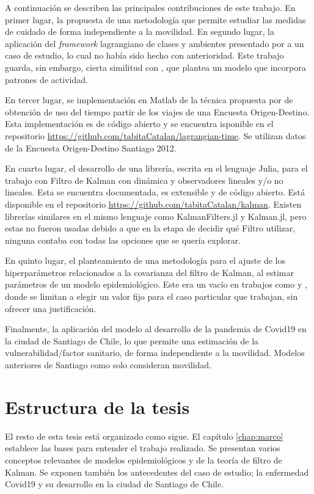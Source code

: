 \begin{intro}
A continuación se describen las principales contribuciones de este trabajo. En primer lugar, la propuesta de una metodología que permite estudiar las medidas de cuidado de forma independiente a la movilidad. En segundo lugar, la aplicación del \textit{framework} lagrangiano de clases y ambientes presentado por \cite{Bichara2018} a un caso de estudio, lo cual no había sido hecho con anterioridad. Este trabajo guarda, sin embargo, cierta similitud con \cite{Shikhmurzaev}, que plantea un modelo que incorpora patrones de actividad.

En tercer lugar, se implementación en Matlab de la técnica propuesta por \cite{Munizaga2011} de obtención de uso del tiempo partir de los viajes de una Encuesta Origen-Destino. Esta implementación es de código abierto y se encuentra isponible en el repositorio \url{https://github.com/tabitaCatalan/lagrangian-time}. Se utilizan datos de la Encuesta Origen-Destino Santiago 2012.

En cuarto lugar, el desarrollo de una librería, escrita en el lenguaje Julia, para el trabajo con Filtro de Kalman con dinámica y observadores lineales y/o no lineales. Esta se encuentra documentada, es extensible y de código abierto. Está disponible en el repositorio \url{https://github.com/tabitaCatalan/kalman}. Existen librerías similares en el mismo lenguaje como KalmanFilters.jl y Kalman.jl, pero estas no fueron usadas debido a que en la etapa de decidir qué Filtro utilizar, ninguna contaba con todas las opciones que se quería explorar. 

En quinto lugar, el planteamiento de una metodología para el ajuste de los hiperparámetros relacionados a la covarianza del filtro de Kalman, al estimar parámetros de un modelo epidemiológico. Este era un vacío en trabajos como \cite{Hasan2020} y \cite{Sameni2020}, donde se limitan a elegir un valor fijo para el caso particular que trabajan, sin ofrecer una justificación.

Finalmente, la aplicación del modelo al desarrollo de la pandemia de Covid19 en la ciudad de Santiago de Chile, lo que permite una estimación de la vulnerabilidad/factor sanitario, de forma independiente a la movilidad. Modelos anteriores de Santiago como \cite{Gozzi2021} solo consideran movilidad.


\section*{Estructura de la tesis}
El resto de esta tesis está organizado como sigue. El capítulo \ref{chap:marco} establece las bases para entender el trabajo realizado. Se presentan varios conceptos relevantes de modelos epidemiológicos y de la teoría de filtro de Kalman. Se exponen también los antecedentes del caso de estudio; la enfermedad Covid19 y su desarrollo en la ciudad de Santiago de Chile.


\end{intro}
